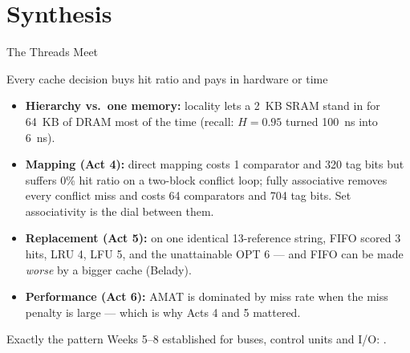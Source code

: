 \documentclass[aspectratio=169]{beamer}
\begin{document}

\section{Synthesis}

\begin{frame}{The Threads Meet}
  \small
  \begin{block}{Every cache decision buys hit ratio and pays in hardware or time}
    \begin{itemize}
      \item \textbf{Hierarchy vs.\ one memory:} locality lets a 2~KB SRAM
        stand in for 64~KB of DRAM most of the time (recall: $H=0.95$ turned
        100~ns into 6~ns).
      \item \textbf{Mapping (Act 4):} direct mapping costs 1 comparator and
        320 tag bits but suffers 0\% hit ratio on a two-block conflict loop;
        fully associative removes every conflict miss and costs 64 comparators
        and 704 tag bits. Set associativity is the dial between them.
      \item \textbf{Replacement (Act 5):} on one identical 13-reference
        string, FIFO scored 3 hits, LRU 4, LFU 5, and the unattainable OPT 6
        --- and FIFO can be made \emph{worse} by a bigger cache (Belady).
      \item \textbf{Performance (Act 6):} AMAT is dominated by miss rate when
        the miss penalty is large --- which is why Acts 4 and 5 mattered.
    \end{itemize}
  \end{block}
  Exactly the pattern Weeks 5--8 established for buses, control units and I/O:
  .
\end{frame}
\end{document}
